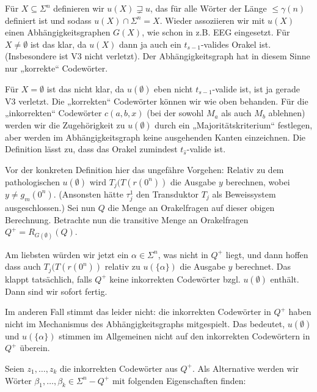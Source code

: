 \documentclass[nofonts]{uebung}
\def\SAT{\ensuremath{\mathrm{SAT}}}
\begin{document}
Für $X \subseteq \Sigma^n$ definieren wir $u(X)\sqsupsetneq u$, das für alle Wörter der Länge $\leq \gamma (n)$ definiert ist und sodass $u(X) \cap \Sigma^n = X$.
Wieder assoziieren wir mit $u(X)$ einen Abhängigkeitsgraphen $G(X)$, wie schon in z.B. EEG eingesetzt.
Für $X\neq\emptyset$ ist das klar, da $u(X)$ dann ja auch ein $t_{s-1}$-valides Orakel ist. (Insbesondere ist V3 nicht verletzt). Der Abhängigkeitsgraph hat in diesem Sinne nur „korrekte“ Codewörter.

Für $X=\emptyset$ ist das nicht klar, da $u(\emptyset)$ eben nicht $t_{s-1}$-valide ist, ist ja gerade V3 verletzt. Die „korrekten“ Codewörter können wir wie oben behanden. Für die „inkorrekten“ Codewörter $c(a,b,x)$ (bei der sowohl $M_a$ als auch $M_b$ ablehnen) werden wir die Zugehörigkeit zu $u(\emptyset)$ durch ein „Majoritätskriterium“ festlegen, aber werden im Abhängigkeitsgraph keine ausgehenden Kanten einzeichnen. Die Definition lässt zu, dass  das Orakel zumindest $t_{\hat{s}}$-valide ist.
\medskip

Vor der konkreten Definition hier das ungefähre Vorgehen: Relativ zu dem pathologischen $u(\emptyset)$ wird $T_j(T(r(0^n))$ die Ausgabe $y$ berechnen, wobei $y\neq g_m(0^n)$. (Ansonsten hätte $\tau^1_j$ den Transduktor $T_j$ als Beweissystem ausgeschlossen.)
%
Sei nun $Q$ die Menge an Orakelfragen auf dieser obigen Berechnung.
Betrachte nun die transitive Menge an Orakelfragen $Q^+=R_{G(\emptyset)}(Q)$.

Am liebsten würden wir jetzt ein $\alpha\in\Sigma^n$, was nicht in $Q^+$ liegt,
und dann hoffen dass auch $T_j(T(r(0^n))$ relativ zu $u(\{\alpha\})$ die Ausgabe $y$ berechnet.
Das klappt tatsächlich, falls $Q^+$ keine inkorrekten Codewörter bzgl. $u(\emptyset)$ enthält.
Dann sind wir sofort fertig.

Im anderen Fall stimmt das leider nicht: die inkorrekten Codewörter in $Q^+$ haben nicht im Mechanismus des Abhängigkeitsgraphs mitgespielt.
Das bedeutet, $u(\emptyset)$ und $u(\{\alpha\})$ stimmen im Allgemeinen nicht auf den inkorrekten Codewörtern in $Q^+$ überein.

Seien $z_1, \dots, z_k$ die inkorrekten Codewörter aus $Q^+$. Als Alternative werden wir Wörter $\beta_1, \dots, \beta_k\in \Sigma^n-Q^+$ mit folgenden Eigenschaften finden:
\end{document}
